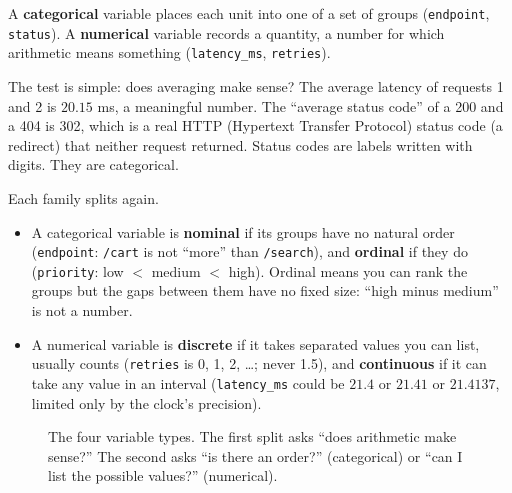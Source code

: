 \begin{definition}
A \textbf{categorical} variable places each unit into one of a set of groups (\texttt{endpoint},
\texttt{status}). A \textbf{numerical} variable records a quantity, a number for which
arithmetic means something (\texttt{latency\_ms}, \texttt{retries}).
\end{definition}

The test is simple: does averaging make sense? The average latency of requests 1 and 2 is
$20.15$ ms, a meaningful number. The ``average status code'' of a 200 and a 404 is 302, which is
a real HTTP (Hypertext Transfer Protocol) status code (a redirect) that neither request returned. Status codes are labels written
with digits. They are categorical.

Each family splits again.

\begin{itemize}
  \item A categorical variable is \textbf{nominal} if its groups have no natural order
  (\texttt{endpoint}: \texttt{/cart} is not ``more'' than \texttt{/search}), and
  \textbf{ordinal} if they do (\texttt{priority}: low $<$ medium $<$ high). Ordinal means
  you can rank the groups but the gaps between them have no fixed size: ``high minus medium''
  is not a number.
  \item A numerical variable is \textbf{discrete} if it takes separated values you can list,
  usually counts (\texttt{retries} is 0, 1, 2, \dots; never 1.5), and \textbf{continuous} if
  it can take any value in an interval (\texttt{latency\_ms} could be $21.4$ or $21.41$ or
  $21.4137$, limited only by the clock's precision).
\end{itemize}

\begin{figure}[H]
\centering
{}
\caption{The four variable types. The first split asks ``does arithmetic make sense?'' The
second asks ``is there an order?'' (categorical) or ``can I list the possible values?''
(numerical).}
\label{fig:data-types-tree}
\end{figure}

